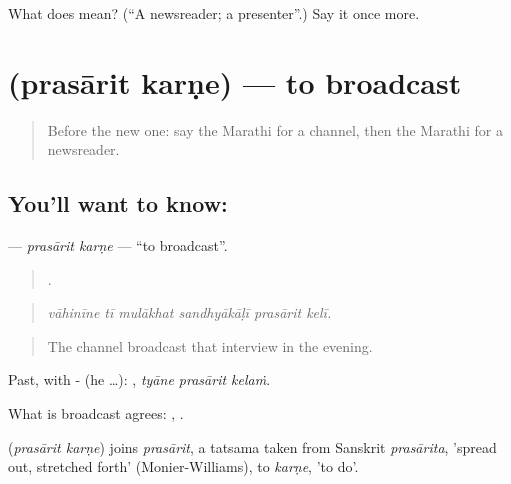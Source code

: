 \begin{tcolorbox}[breakable,colback=teal!4,colframe=teal!35!black,title={Before you move on}]
What does  mean? (\textquotedblleft{}A newsreader; a presenter\textquotedblright{}.) Say it once more.
\end{tcolorbox}
\section[\texorpdfstring{\mr{प्रसारित} \mr{करणे} (prasārit karṇe)}{प्रसारित करणे (prasārit karṇe)}]{  (prasārit karṇe) — to broadcast}

\label{lesson:MR-C312-prasarit-karne}



\begin{quote}
Before the new one: say the Marathi for a channel, then the Marathi for a newsreader.
\end{quote}

\subsection*{You'll want to know:  }
\textbf{ } — \emph{prasārit karṇe} — \textquotedblleft{}to broadcast\textquotedblright{}.

\begin{quote}
     .
\end{quote}

\begin{quote}
\emph{vāhinīne tī mulākhat sandhyākāḷī prasārit kelī.}
\end{quote}

\begin{quote}
The channel broadcast that interview in the evening.
\end{quote}

Past, with - (he …):   , \emph{tyāne prasārit kelaṁ}.

What is broadcast agrees:   ,   .

\begin{cousinweb}
\textbf{ } (\emph{prasārit karṇe}) joins \emph{prasārit}, a tatsama taken from Sanskrit \emph{prasārita}, 'spread out, stretched forth' (Monier-Williams), to \emph{karṇe}, 'to do'.
\end{cousinweb}

